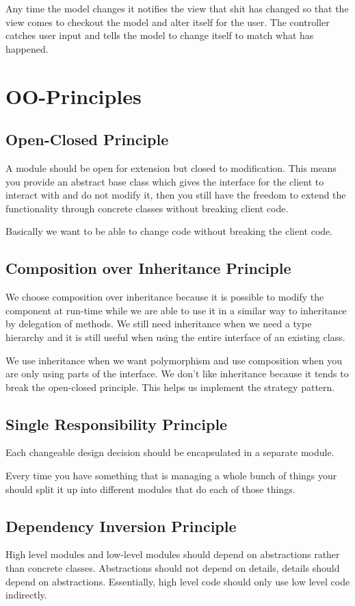 \documentclass[12pt]{article}
\begin{document}
Any time the model changes it notifies the view that shit has changed so that the view comes to checkout the model and alter itself for the user. The controller catches user input and tells the model to change itself to match what has happened.

\section*{OO-Principles}
\subsection*{Open-Closed Principle}
A module should be open for extension but closed to modification. This means you provide an abstract base class which gives the interface for the client to interact with and do not modify it, then you still have the freedom to extend the functionality through concrete classes without breaking client code.

Basically we want to be able to change code without breaking the client code.

\subsection*{Composition over Inheritance Principle}
We choose composition over inheritance because it is possible to modify the component at run-time while we are able to use it in a similar way to inheritance by delegation of methods. We still need inheritance when we need a type hierarchy and it is still useful when using the entire interface of an existing class.

We use inheritance when we want polymorphism and use composition when you are only using parts of the interface. We don't like inheritance because it tends to break the open-closed principle. This helps us implement the strategy pattern.

\subsection*{Single Responsibility Principle}
Each changeable design decision should be encapsulated in a separate module.

Every time you have something that is managing a whole bunch of things your should split it up into different modules that do each of those things.

\subsection*{Dependency Inversion Principle}
High level modules and low-level modules should depend on abstractions rather than concrete classes. Abstractions should not depend on details, details should depend on abstractions. Essentially, high level code should only use low level code indirectly.
\end{document}

